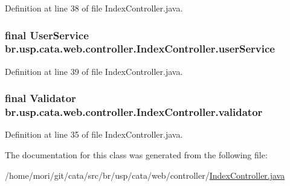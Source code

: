 Definition at line 38 of file Index\+Controller.\+java.

\hypertarget{classbr_1_1usp_1_1cata_1_1web_1_1controller_1_1_index_controller_aae8b09d6f60a8edd3995685b8f1cd86c}{
\subsubsection[{user\+Service}]{\setlength{\rightskip}{0pt plus 5cm}final {\bf User\+Service} br.\+usp.\+cata.\+web.\+controller.\+Index\+Controller.\+user\+Service\hspace{0.3cm}{\ttfamily [private]}}}\label{classbr_1_1usp_1_1cata_1_1web_1_1controller_1_1_index_controller_aae8b09d6f60a8edd3995685b8f1cd86c}


Definition at line 39 of file Index\+Controller.\+java.

\hypertarget{classbr_1_1usp_1_1cata_1_1web_1_1controller_1_1_index_controller_aeff3144091a7190b11bce384268d3dff}{
\subsubsection[{validator}]{\setlength{\rightskip}{0pt plus 5cm}final Validator br.\+usp.\+cata.\+web.\+controller.\+Index\+Controller.\+validator\hspace{0.3cm}{\ttfamily [private]}}}\label{classbr_1_1usp_1_1cata_1_1web_1_1controller_1_1_index_controller_aeff3144091a7190b11bce384268d3dff}


Definition at line 35 of file Index\+Controller.\+java.



The documentation for this class was generated from the following file\+:\begin{DoxyCompactItemize}
\item 
/home/mori/git/cata/src/br/usp/cata/web/controller/\hyperlink{_index_controller_8java}{Index\+Controller.\+java}\end{DoxyCompactItemize}
